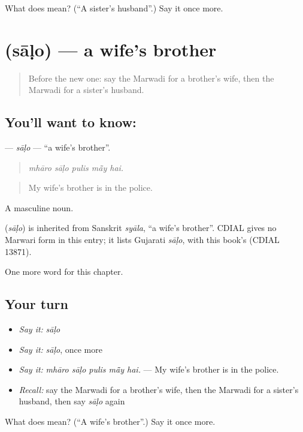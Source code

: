 \begin{tcolorbox}[breakable,colback=teal!4,colframe=teal!35!black,title={Before you move on}]
What does  mean? (\textquotedblleft{}A sister's husband\textquotedblright{}.) Say it once more.
\end{tcolorbox}
\section[\texorpdfstring{\mw{साळो} (sāḷo)}{साळो (sāḷo)}]{ (sāḷo) — a wife's brother}

\label{lesson:MW-C260-salo}



\begin{quote}
Before the new one: say the Marwadi for a brother's wife, then the Marwadi for a sister's husband.
\end{quote}

\subsection*{You'll want to know: }
\textbf{} — \emph{sāḷo} — \textquotedblleft{}a wife's brother\textquotedblright{}.

\begin{quote}
    
\end{quote}

\begin{quote}
\emph{mhāro sāḷo pulis mā̃y hai.}
\end{quote}

\begin{quote}
My wife's brother is in the police.
\end{quote}

A masculine noun.

\begin{cousinweb}
\textbf{} (\emph{sāḷo}) is inherited from Sanskrit \emph{syāla}, \textquotedblleft{}a wife's brother\textquotedblright{}. CDIAL gives no Marwari form in this entry; it lists Gujarati \emph{sāḷo}, with this book's  (CDIAL 13871).
\end{cousinweb}

\begin{grammarlens}[title={What you've built}]
One more word for this chapter.
\end{grammarlens}

\subsection*{Your turn}
\begin{itemize}
\raggedright
  \item \emph{Say it:} \emph{sāḷo}
  \item \emph{Say it:} \emph{sāḷo}, once more
  \item \emph{Say it:} \emph{mhāro sāḷo pulis mā̃y hai.} — My wife's brother is in the police.
  \item \emph{Recall:} say the Marwadi for a brother's wife, then the Marwadi for a sister's husband, then say \emph{sāḷo} again
\end{itemize}

\begin{tcolorbox}[breakable,colback=teal!4,colframe=teal!35!black,title={Before you move on}]
What does  mean? (\textquotedblleft{}A wife's brother\textquotedblright{}.) Say it once more.
\end{tcolorbox}
